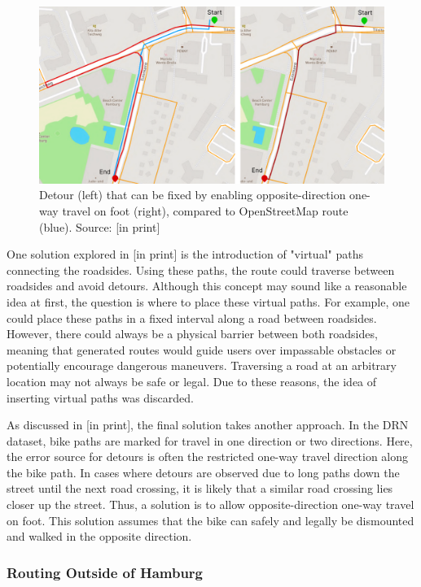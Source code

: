 \begin{figure}[htbp]
\centering
\includegraphics[width=\linewidth]{images/oneway-travel-fix.png}
\caption{Detour (left) that can be fixed by enabling opposite-direction one-way travel on foot (right), compared to OpenStreetMap route (blue). Source: [in print]}
\label{fig:oneway-travel-fix}
\end{figure}

One solution explored in [in print] is the introduction of "virtual" paths connecting the roadsides. Using these paths, the route could traverse between roadsides and avoid detours. Although this concept may sound like a reasonable idea at first, the question is where to place these virtual paths. For example, one could place these paths in a fixed interval along a road between roadsides. However, there could always be a physical barrier between both roadsides, meaning that generated routes would guide users over impassable obstacles or potentially encourage dangerous maneuvers. Traversing a road at an arbitrary location may not always be safe or legal. Due to these reasons, the idea of inserting virtual paths was discarded.

As discussed in [in print], the final solution takes another approach. In the DRN dataset, bike paths are marked for travel in one direction or two directions. Here, the error source for detours is often the restricted one-way travel direction along the bike path. In cases where detours are observed due to long paths down the street until the next road crossing, it is likely that a similar road crossing lies closer up the street. Thus, a solution is to allow opposite-direction one-way travel on foot. This solution assumes that the bike can safely and legally be dismounted and walked in the opposite direction.

\subsubsection{Routing Outside of Hamburg}

